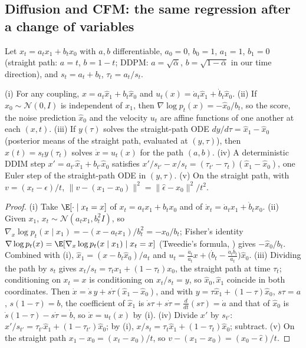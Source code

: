\subsection{Diffusion and CFM: the same regression after a change of variables}\label{app:d9}
Let $x_t=a_tx_1+b_tx_0$ with $a,b$ differentiable, $a_0=0$, $b_0=1$, $a_1=1$, $b_1=0$ (straight path: $a=t$, $b=1-t$; DDPM: $a=\sqrt{\bar\alpha}$, $b=\sqrt{1-\bar\alpha}$ in our time direction), and $s_t=a_t+b_t$, $\tau_t=a_t/s_t$.
\begin{proposition}\label{prop:d9}
(i) For any coupling, $x=a_t\hat x_1+b_t\hat x_0$ and $u_t(x)=\dot a_t\hat x_1+\dot b_t\hat x_0$.
(ii) If $x_0\sim\mathcal N(0,I)$ is independent of $x_1$, then $\nabla\log p_t(x)=-\hat x_0/b_t$, so the score, the noise prediction $\hat x_0$ and the velocity $u_t$ are affine functions of one another at each $(x,t)$.
(iii) If $y(\tau)$ solves the straight-path ODE $dy/d\tau=\hat x_1-\hat x_0$ (posterior means of the straight path, evaluated at $(y,\tau)$), then $x(t)=s_ty(\tau_t)$ solves $\dot x=u_t(x)$ for the path $(a,b)$.
(iv) A deterministic DDIM step $x'=a_{t'}\hat x_1+b_{t'}\hat x_0$ satisfies $x'/s_{t'}-x/s_t=(\tau_{t'}-\tau_t)(\hat x_1-\hat x_0)$, one Euler step of the straight-path ODE in $(y,\tau)$.
(v) On the straight path, with $v=(x_t-\hat\epsilon)/t$, $\|v-(x_1-x_0)\|^2=\|\hat\epsilon-x_0\|^2/t^2$.
\end{proposition}
\begin{proof}
(i) Take $\E[\cdot\mid x_t=x]$ of $x_t=a_tx_1+b_tx_0$ and of $\dot x_t=\dot a_tx_1+\dot b_tx_0$.
(ii) Given $x_1$, $x_t\sim\mathcal N(a_tx_1,b_t^2I)$, so $\nabla_x\log p_t(x\mid x_1)=-(x-a_tx_1)/b_t^2=-x_0/b_t$; Fisher's identity $\nabla\log p_t(x)=\E[\nabla_x\log p_t(x\mid x_1)\mid x_t=x]$ (Tweedie's formula, \citealp{efron2011tweedie}) gives $-\hat x_0/b_t$. Combined with (i), $\hat x_1=(x-b_t\hat x_0)/a_t$ and $u_t=\frac{\dot a_t}{a_t}x+\big(\dot b_t-\frac{\dot a_tb_t}{a_t}\big)\hat x_0$.
(iii) Dividing the path by $s_t$ gives $x_t/s_t=\tau_tx_1+(1-\tau_t)x_0$, the straight path at time $\tau_t$; conditioning on $x_t=x$ is conditioning on $x_t/s_t=y$, so $\hat x_0,\hat x_1$ coincide in both coordinates. Then $\dot x=\dot s\,y+s\dot\tau(\hat x_1-\hat x_0)$, and with $y=\tau\hat x_1+(1-\tau)\hat x_0$, $s\tau=a$, $s(1-\tau)=b$, the coefficient of $\hat x_1$ is $\dot s\tau+s\dot\tau=\frac{d}{dt}(s\tau)=\dot a$ and that of $\hat x_0$ is $\dot s(1-\tau)-s\dot\tau=\dot b$, so $\dot x=u_t(x)$ by (i).
(iv) Divide $x'$ by $s_{t'}$: $x'/s_{t'}=\tau_{t'}\hat x_1+(1-\tau_{t'})\hat x_0$; by (i), $x/s_t=\tau_t\hat x_1+(1-\tau_t)\hat x_0$; subtract.
(v) On the straight path $x_1-x_0=(x_t-x_0)/t$, so $v-(x_1-x_0)=(x_0-\hat\epsilon)/t$.
\end{proof}
